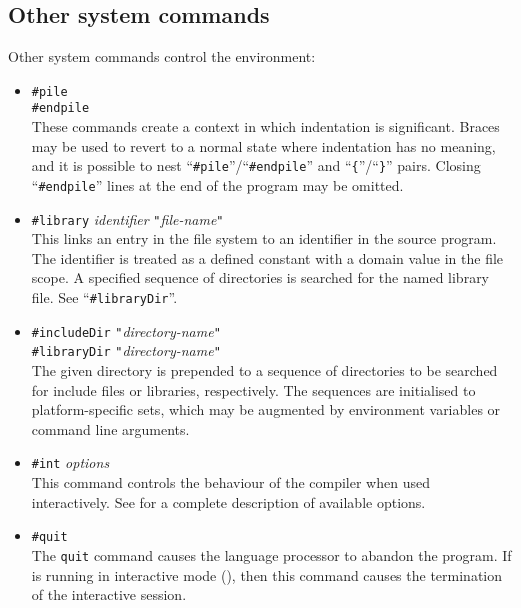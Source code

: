 \subsection{Other system commands}%
Other system commands control the environment:
\begin{itemize}
\item
\verb'#pile'
\\
\verb'#endpile'
\\
These commands create a context in which indentation is significant.
Braces may be used to revert to a normal
state where indentation has no meaning, and
it is possible to nest
``\verb"#pile"''/``\verb"#endpile"''
and
``\verb"{"''/``\verb"}"''
pairs.
Closing ``\verb"#endpile"'' lines
at the end of the program may be omitted.
\item
\verb'#library' {\it identifier\/} \verb'"'{\it file-name\/}\verb'"'
\\
This links an entry in the file system to an identifier in the
source program.  
The identifier is treated as a defined constant with a domain value
in the file scope.
A specified sequence of directories is searched for the named library file.
See ``\verb"#libraryDir"''.
%
\item
\verb'#includeDir' \verb'"'{\it directory-name\/}\verb'"'
\\
\verb'#libraryDir' \verb'"'{\it directory-name\/}\verb'"'
\\
The given directory is prepended to a sequence of directories to be searched
for include files or libraries, respectively.
The sequences are initialised to platform-specific sets, which may be
augmented by environment variables or command line arguments.
%
\item
\verb'#int' {\it options}
\\
This command controls the behaviour of the compiler when used 
interactively. See  for a complete
description of available options.
\item
\verb'#quit'
\\
The \verb'quit' command causes the language processor to abandon the
program. If \asharp{} is running in interactive mode (), then this command causes the termination of the interactive session.
\end{itemize}


